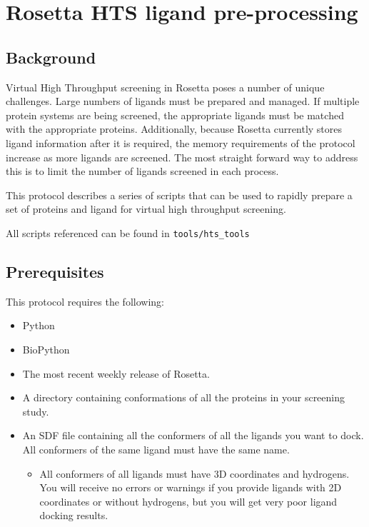 \chapter{Rosetta HTS ligand pre-processing}

\section{Background}

Virtual High Throughput screening in Rosetta poses a number of unique challenges.
Large numbers of ligands must be prepared and managed.
If multiple protein systems are being screened, the appropriate ligands must be matched with the appropriate proteins. 
Additionally, because Rosetta currently stores ligand information after it is required, the memory requirements of the protocol increase as more ligands are screened.
The most straight forward way to address this is to limit the number of ligands screened in each process.

This protocol describes a series of scripts that can be used to rapidly prepare a set of proteins and ligand for virtual high throughput screening.

All scripts referenced can be found in \texttt{tools/hts\_tools}

\section{Prerequisites}

This protocol requires the following:

\begin{itemize}
\item Python
\item BioPython
\item The most recent weekly release of Rosetta.
\item A directory containing conformations of all the proteins in your screening study.
\item An SDF file containing all the conformers of all the ligands you want to dock. All conformers of the same ligand must have the same name.
	\begin{itemize}
	\item All conformers of all ligands must have 3D coordinates and hydrogens.
	You will receive no errors or warnings if you provide ligands with 2D coordinates or without hydrogens, but you will get very poor ligand docking results.
	\end{itemize}
\end{itemize}

